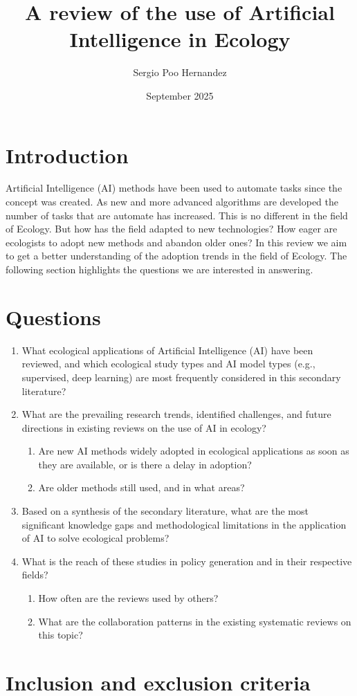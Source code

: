 \documentclass{article}
\title{A review of the use of Artificial Intelligence in Ecology}
\author{Sergio Poo Hernandez}
\date{September 2025}
\newcommand{\ben}{\begin{enumerate}}
\newcommand{\een}{\end{enumerate}}
\begin{document}
\maketitle

\section{Introduction}

Artificial Intelligence (AI) methods have been used to automate tasks since the concept was created. As new and more advanced algorithms are developed the number of tasks that are automate has increased. This is no different in the field of Ecology. But how has the field adapted to new technologies? How eager are ecologists to adopt new methods and abandon older ones? In this review we aim to get a better understanding of the adoption trends in the field of Ecology. The following section highlights the questions we are interested in answering.

\section{Questions}
\ben
\item What ecological applications of Artificial Intelligence (AI) have been reviewed, and which ecological study types and AI model types (e.g., supervised, deep learning) are most frequently considered in this secondary literature?
\item What are the prevailing research trends, identified challenges, and future directions in existing reviews on the use of AI in ecology? 
\ben
\item Are new AI methods widely adopted in ecological applications as soon as they are available, or is there a delay in adoption?
\item Are older methods still used, and in what areas?
\een
\item Based on a synthesis of the secondary literature, what are the most significant knowledge gaps and methodological limitations in the application of AI to solve ecological problems?
\item What is the reach of these studies in policy generation and in their respective fields?
\ben
\item How often are the reviews used by others?
\item What are the collaboration patterns in the existing systematic reviews on this topic?
\een
\een

\section{Inclusion and exclusion criteria}
\end{document}
